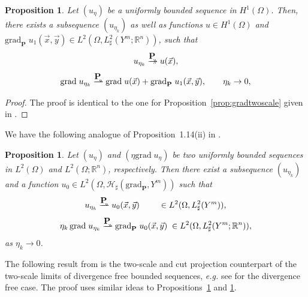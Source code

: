 \documentclass[a4paper,reqno]{amsart}
\numberwithin{equation}{section}
\numberwithin{equation}{section}		%
\numberwithin{figure}{section}			%
\numberwithin{table}{section}				%
\newcommand{\R}{\mathbb{R}}
\newtheorem{proposition}[theorem]{Proposition}
\theoremstyle{definition}
\newcommand{\<}{\ensuremath \leq}
\renewcommand{\>}{\ensuremath \geq}
\def\e{\eta}
\def\xy{(\vec{x},\vec{y})}
\def\wdto{\buildrel\hbox{$\textbf{P}$}\over
\rightharpoonup \!\!\!\!\! \rightharpoonup}
\def\dto{\buildrel\hbox{$\textbf{P}$}\over
\to \!\!\!\!\! \to}
\def\O{\Omega}
\begin{document}
\begin{proposition}\label{prop:grad-split}
Let  $(u_\e)$ be a uniformly bounded
sequence in $H^1(\Omega)$.
Then, there exists a subsequence $(u_{\e_k})$
as well as functions $u\in H^1(\Omega)$ and $\mathrm{grad}_\textbf{P} \;  {u}_1\xy \in L^2(\Omega, L^2_\sharp(Y^m; \R^n ))$,
such that
\begin{equation}\label{eq:gradsplit_2s_strong}
u_{\e_k} \dto u(\vec{x}),
\end{equation}
\begin{equation}
\mathrm{grad}\; u_{\e_k} \wdto \mathrm{grad} \; u (\vec{x}) + \mathrm{grad}_\textbf{P} \;  u_1\xy ,  \qquad
{\e_k} \to 0,
\end{equation}
\end{proposition}
\begin{proof}
The proof \cite{wellander2018two} is identical to the one for Proposition~\ref{prop:gradtwoscale} given in \cite[Proposition~2.13]{Bouchitte+etal2010}.
\end{proof}

We have the following analogue of Proposition~1.14(ii) in \cite{Allaire1992}.
\begin{proposition}\label{prop:eta_grad}
Let  $(u_\e)$ and $(\e\mathrm{grad}\;{u}_\e)$ be two uniformly bounded
sequences in $L^2(\Omega)$ and $L^2(\Omega;\R^n)$, respectively.
Then there exist a subsequence
 $({u}_{\e_k})$
and a function {${u}_0\in L^2(\O,{\mathcal H}_{\sharp}(\mathrm{grad}_\textbf{P} ,Y^m))$}
such that
\begin{equation}\label{eq:u_2s_weak}
u_{\e_k} \wdto u_0(\vec{x},\vec{y})\; \qquad \in L^2(\O,L^2_{\sharp}(Y^m)),
\end{equation}
\begin{equation}\label{eq:etagradu_2s}
{\e_k} \, \mathrm{grad}\; u_{\e_k} \wdto  \mathrm{grad}_\textbf{P}  \; {u}_0\xy  \; \in L^2(\O,L^2_{\sharp}(Y^m;\R^n)),
\end{equation}
as ${\e_k} \to 0$.
\end{proposition}

The following result from \cite{Bouchitte+etal2010,wellander2018two} is the two-scale and cut projection counterpart of the two-scale limits of divergence free bounded sequences,   \emph{e.g.} see \cite{Allaire1992} for the divergence free case. The proof uses similar ideas to Propositions~\ref{prop:grad-split} and \ref{prop:eta_grad}.
\end{document}
